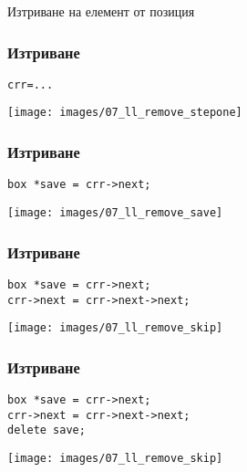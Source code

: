 \documentclass{beamer}
\begin{document}
\begin{frame}
\centerline{Изтриване на елемент от позиция}
\end{frame}




\begin{frame}[fragile]
\frametitle{Изтриване}

\begin{flushleft}
\begin{lstlisting}
crr=...
\end{lstlisting}  
\end{flushleft}


\texttt{[image: images/07\_ll\_remove\_stepone]}

\end{frame}


\begin{frame}[fragile]
\frametitle{Изтриване}

\begin{flushleft}
\begin{lstlisting}
box *save = crr->next;
\end{lstlisting}  
\end{flushleft}


\texttt{[image: images/07\_ll\_remove\_save]}

\end{frame}


\begin{frame}[fragile]
\frametitle{Изтриване}

\begin{flushleft}
\begin{lstlisting}
box *save = crr->next;
crr->next = crr->next->next;
\end{lstlisting}  
\end{flushleft}


\texttt{[image: images/07\_ll\_remove\_skip]}

\end{frame}


\begin{frame}[fragile]
\frametitle{Изтриване}

\begin{flushleft}
\begin{lstlisting}
box *save = crr->next;
crr->next = crr->next->next;
delete save;
\end{lstlisting}  
\end{flushleft}


\texttt{[image: images/07\_ll\_remove\_skip]}

\end{frame}
\end{document}
